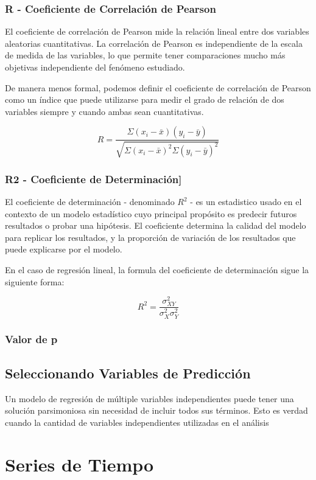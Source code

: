 \documentclass[letterpaper, spanish, 11pt]{report}
\begin{document}
\subsubsection{R - Coeficiente de Correlación de Pearson}
El coeficiente de correlación de Pearson mide la relación lineal entre dos variables aleatorias cuantitativas. La correlación de Pearson es independiente de la escala de medida de las variables, lo que permite tener comparaciones mucho más objetivas independiente del fenómeno estudiado.

De manera menos formal, podemos definir el coeficiente de correlación de Pearson como un índice que puede utilizarse para medir el grado de relación de dos variables siempre y cuando ambas sean cuantitativas.

\[R = \frac{\Sigma(x_i - \bar{x})(y_i - \bar{y})}{\sqrt{\Sigma(x_i - \bar{x})^2\Sigma(y_i - \bar{y})^2}}\]

\subsubsection{R2 - Coeficiente de Determinación]}
El coeficiente de determinación - denominado \(R^{2}\) - es un estadistico usado en el contexto de un modelo estadístico cuyo principal propósito es predecir futuros resultados o probar una hipótesis. El coeficiente determina la calidad del modelo para replicar los resultados, y la proporción de variación de los resultados que puede explicarse por el modelo. 

En el caso de regresión lineal, la formula del coeficiente de determinación sigue la siguiente forma:

\[R^{2} = \frac{\sigma^{2}_{XY}}{\sigma^{2}_{X}\sigma^{2}_{Y}}\]

\subsubsection{Valor de p}

\subsection{Seleccionando Variables de Predicción}
Un modelo de regresión de múltiple variables independientes puede tener una solución parsimoniosa sin necesidad de incluir todos sus términos. Esto es verdad cuando la cantidad de variables independientes utilizadas en el análisis 

\section{Series de Tiempo}
\end{document}
